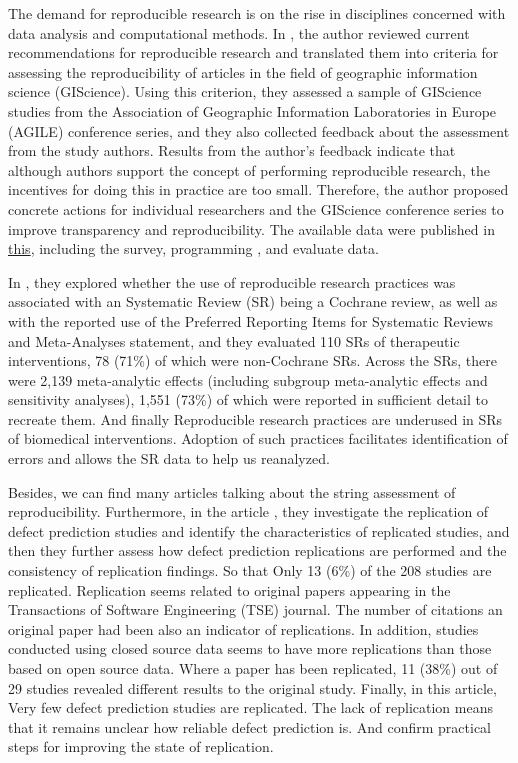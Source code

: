 \documentclass[
10pt, %
a4paper, %
oneside, %
headinclude,footinclude, %
BCOR5mm, %
]{scrartcl}
\begin{document}
The demand for reproducible research is on the rise in disciplines concerned with data analysis and computational methods. In \cite{nust2018reproducible}, the author reviewed current recommendations for reproducible research and translated them into criteria for assessing the reproducibility of articles in the field of geographic information science (GIScience). Using this criterion, they assessed a sample of GIScience studies from the Association of Geographic Information Laboratories in Europe (AGILE) conference series, and they also collected feedback about the assessment from the study authors. Results from the author's feedback indicate that although authors support the concept of performing reproducible research, the incentives for doing this in practice are too small. Therefore, the author proposed concrete actions for individual researchers and the GIScience conference series to improve transparency and reproducibility. The available data were published in \href{https://github.com/nuest/reproducible-research-and-giscience}{this}, 
including the survey, programming , and evaluate data.

In \cite{PAGE20188}, they explored whether the use of reproducible research practices was associated with an Systematic Review (SR) being a Cochrane review, as well as with the reported use of the Preferred Reporting Items for Systematic Reviews and Meta-Analyses statement, and they evaluated 110 SRs of therapeutic interventions, 78 (71\%) of which were non-Cochrane SRs. Across the SRs, there were 2,139 meta-analytic effects (including subgroup meta-analytic effects and sensitivity analyses), 1,551 (73\%) of which were reported in sufficient detail to recreate them. And finally Reproducible research practices are underused in SRs of biomedical interventions. Adoption of such practices facilitates identification of errors and allows the SR data to help us  reanalyzed.

Besides, we can find many articles talking about the string assessment of reproducibility. Furthermore, in the article \cite{MAHMOOD2018148}, they investigate the replication of defect prediction studies and identify the characteristics of replicated studies, and then  they further assess how defect prediction replications are performed and the consistency of replication findings. So that Only 13 (6\%) of the 208 studies are replicated. Replication seems related to original papers appearing in the Transactions of Software Engineering (TSE) journal. The number of citations an original paper had been also an indicator of replications. In addition, studies conducted using closed source data seems to have more replications than those based on open source data. Where a paper has been replicated, 11 (38\%) out of 29 studies revealed different results to the original study. Finally, in this article, Very few defect prediction studies are replicated. The lack of replication means that it remains unclear how reliable defect prediction is. And confirm practical steps for improving the state of replication.
\end{document}
